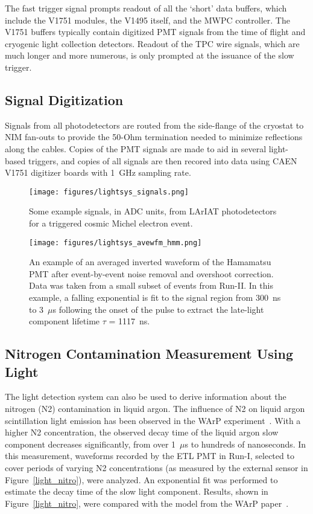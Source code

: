 The fast trigger signal prompts readout of all the `short' data buffers, which include the V1751 modules, the V1495 itself, and the MWPC controller.  The V1751 buffers typically contain digitized PMT signals from the time of flight and cryogenic light collection detectors. Readout of the TPC wire signals, which are much longer and more numerous, is only prompted at the issuance of the slow trigger.


\subsection*{Signal Digitization}

Signals from all photodetectors are routed from the side-flange of the cryostat to NIM fan-outs to provide the 50-Ohm termination needed to minimize reflections along the cables. Copies of the PMT signals are made to aid in several light-based triggers, and copies of all signals are then recored into data using CAEN V1751 digitizer boards with 1~GHz sampling rate.

\begin{figure}
\centering
\texttt{[image: figures/lightsys\_signals.png]}
\caption{Some example signals, in ADC units, from LArIAT photodetectors for a triggered cosmic Michel electron event.}
\label{lightsys_signals}
\end{figure}
\begin{figure}
\centering
\texttt{[image: figures/lightsys\_avewfm\_hmm.png]}
\caption{\label{wfm_hmmpmt}An example of an averaged inverted waveform of the Hamamatsu PMT after event-by-event noise removal and overshoot correction.  Data was taken from a small subset of events from Run-II.  In this example, a falling exponential is fit to the signal region from 300~ns to 3~$\mu$s following the onset of the pulse to extract the late-light component lifetime $\tau$ = 1117~ns.}
\end{figure}

\subsection*{Nitrogen Contamination Measurement Using Light}

The light detection system can also be used to derive information about the nitrogen (N2) contamination in liquid argon. The influence of N2 on liquid argon scintillation light emission has been observed in the WArP experiment~\cite{WARP-nitrogen}. With a higher N2 concentration, the observed decay time of the liquid argon slow component decreases significantly, from over 1~$\mu$s to hundreds of nanoseconds. In this measurement, waveforms recorded by the ETL PMT in Run-I, selected to cover periods of varying N2 concentrations (as measured by the external sensor in Figure~\ref{light_nitro}), were analyzed. An exponential fit was performed to estimate the decay time of the slow light component. Results, shown in Figure~\ref{light_nitro}, were compared with the model from the WArP paper~\cite{WARP-nitrogen}.


